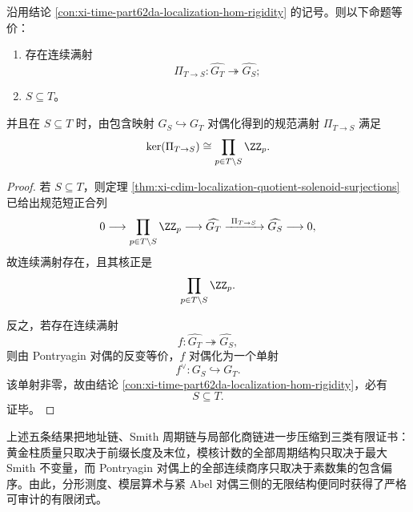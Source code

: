 \begin{corollary}\label{cor:xi-time-part62da-localization-pontryagin-surjection-poset}
沿用结论 \ref{con:xi-time-part62da-localization-hom-rigidity} 的记号。则以下命题等价：
\begin{enumerate}
  \item 存在连续满射
  \[
  \Pi_{T\to S}:\widehat{G_T}\twoheadrightarrow \widehat{G_S};
  \]
  \item \(S\subseteq T\)。
\end{enumerate}
并且在 \(S\subseteq T\) 时，由包含映射 \(G_S\hookrightarrow G_T\) 对偶化得到的规范满射 \(\Pi_{T\to S}\) 满足
\[
\ker(\Pi_{T\to S})\cong \prod_{p\in T\setminus S}\ZZ_p.
\]
\end{corollary}
\begin{proof}
若 \(S\subseteq T\)，则定理 \ref{thm:xi-cdim-localization-quotient-solenoid-surjections} 已给出规范短正合列
\[
0\longrightarrow \prod_{p\in T\setminus S}\ZZ_p
\longrightarrow \widehat{G_T}
\xrightarrow{\ \Pi_{T\to S}\ }
\widehat{G_S}
\longrightarrow 0,
\]
故连续满射存在，且其核正是
\[
\prod_{p\in T\setminus S}\ZZ_p.
\]

反之，若存在连续满射
\[
f:\widehat{G_T}\twoheadrightarrow \widehat{G_S},
\]
则由 Pontryagin 对偶的反变等价，\(f\) 对偶化为一个单射
\[
f^\vee:G_S\hookrightarrow G_T.
\]
该单射非零，故由结论 \ref{con:xi-time-part62da-localization-hom-rigidity}，必有
\[
S\subseteq T.
\]
证毕。
\end{proof}

\noindent
上述五条结果把地址链、Smith 周期链与局部化商链进一步压缩到三类有限证书：黄金柱质量只取决于前缀长度及末位，模核计数的全部周期结构只取决于最大 Smith 不变量，而 Pontryagin 对偶上的全部连续商序只取决于素数集的包含偏序。由此，分形测度、模层算术与紧 Abel 对偶三侧的无限结构便同时获得了严格可审计的有限闭式。

\endinput
